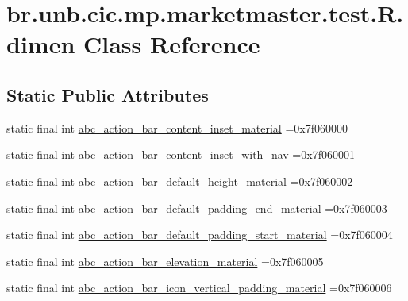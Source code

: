 \hypertarget{classbr_1_1unb_1_1cic_1_1mp_1_1marketmaster_1_1test_1_1R_1_1dimen}{}\section{br.\+unb.\+cic.\+mp.\+marketmaster.\+test.\+R.\+dimen Class Reference}
\label{classbr_1_1unb_1_1cic_1_1mp_1_1marketmaster_1_1test_1_1R_1_1dimen}
\subsection*{Static Public Attributes}
\begin{DoxyCompactItemize}
\item 
static final int \mbox{\hyperlink{classbr_1_1unb_1_1cic_1_1mp_1_1marketmaster_1_1test_1_1R_1_1dimen_a062e9d3fe8c2b1598f3e48817e9e8a0f}{abc\+\_\+action\+\_\+bar\+\_\+content\+\_\+inset\+\_\+material}} =0x7f060000
\item 
static final int \mbox{\hyperlink{classbr_1_1unb_1_1cic_1_1mp_1_1marketmaster_1_1test_1_1R_1_1dimen_a5d3a05a09dbea1ef5959c358aa0a0326}{abc\+\_\+action\+\_\+bar\+\_\+content\+\_\+inset\+\_\+with\+\_\+nav}} =0x7f060001
\item 
static final int \mbox{\hyperlink{classbr_1_1unb_1_1cic_1_1mp_1_1marketmaster_1_1test_1_1R_1_1dimen_ac2a2a75cbd08ee34db2bfb8b2ed49ed2}{abc\+\_\+action\+\_\+bar\+\_\+default\+\_\+height\+\_\+material}} =0x7f060002
\item 
static final int \mbox{\hyperlink{classbr_1_1unb_1_1cic_1_1mp_1_1marketmaster_1_1test_1_1R_1_1dimen_a1fe9bdbf4d2911d1bc4a2b90db5c6d92}{abc\+\_\+action\+\_\+bar\+\_\+default\+\_\+padding\+\_\+end\+\_\+material}} =0x7f060003
\item 
static final int \mbox{\hyperlink{classbr_1_1unb_1_1cic_1_1mp_1_1marketmaster_1_1test_1_1R_1_1dimen_a90f5bc32f95f2d3ed6a47a501416398f}{abc\+\_\+action\+\_\+bar\+\_\+default\+\_\+padding\+\_\+start\+\_\+material}} =0x7f060004
\item 
static final int \mbox{\hyperlink{classbr_1_1unb_1_1cic_1_1mp_1_1marketmaster_1_1test_1_1R_1_1dimen_a177730874d21ab73b25bc0132ac37505}{abc\+\_\+action\+\_\+bar\+\_\+elevation\+\_\+material}} =0x7f060005
\item 
static final int \mbox{\hyperlink{classbr_1_1unb_1_1cic_1_1mp_1_1marketmaster_1_1test_1_1R_1_1dimen_a95d153e49064d8f5ee73a8e2f574f10c}{abc\+\_\+action\+\_\+bar\+\_\+icon\+\_\+vertical\+\_\+padding\+\_\+material}} =0x7f060006

\end{DoxyCompactItemize}
